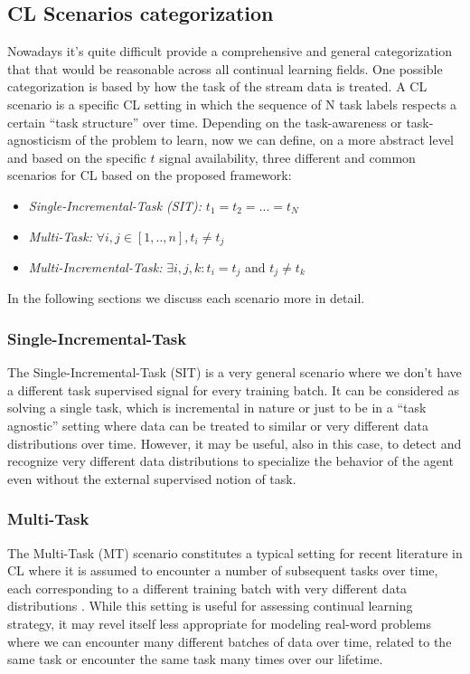 \documentclass[english, LaM, oneside]{sapthesis}%
\begin{document}
\subsection{CL Scenarios categorization}
Nowadays it's quite difficult provide a comprehensive and general categorization that that would be reasonable across all continual learning fields. One possible categorization is based by how the task of the stream data is treated.
A CL scenario is a specific CL setting in which the sequence of N task labels respects a certain “task structure” over time. Depending on the task-awareness or task-agnosticism of the problem to learn, now we can define, on a more abstract level and based on the specific $t$ signal availability, three different and common scenarios for CL based on the proposed framework:
\begin{itemize}
\item \textit{Single-Incremental-Task (SIT): }$t_1 = t_2 = ... = t_N$
\item \textit{Multi-Task: }$ \forall i,j \in [1, .., n], t_i \neq t_j $
\item \textit{Multi-Incremental-Task:} $\exists i,j,k: t_i = t_j$ and $t_j \neq t_k$
\end{itemize}
In the following sections we discuss each scenario more in detail.
 \subsubsection{Single-Incremental-Task}
 The Single-Incremental-Task (SIT) is a very general scenario where we don’t have a different task supervised signal for every training batch. It can be considered as solving a single task, which is incremental in nature or just to be in a “task agnostic” setting where data can be treated to similar or very different data distributions over time. However, it may be useful, also in this case, to detect and recognize very different data distributions to specialize the behavior of the agent even without the external supervised notion of task.
 
 
  \subsubsection{Multi-Task}
  The Multi-Task (MT) scenario constitutes a typical setting for recent literature in CL where it is assumed to encounter a number of subsequent tasks over time, each corresponding to a different training batch with very different data distributions \cite{parisi}. While this setting is useful for assessing continual learning strategy, it may revel itself less appropriate for modeling real-word problems where we can encounter many different batches of data over time, related to the same task or encounter the same task many times over our lifetime.
  
\end{document}
